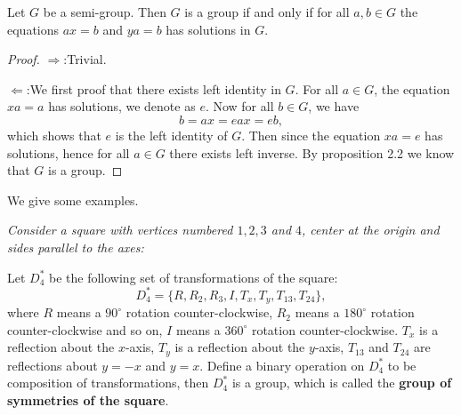 \begin{proposition}
Let $G$ be a semi-group. Then $G$ is a group if and only if for all $a,b\in G$ the equations $ax=b$ and $ya=b$ has solutions in $G$.
\end{proposition}
\begin{proof}
$\Rightarrow$:Trivial.\par
$\Leftarrow$:We first proof that there exists left identity in $G$. For all $a\in G$, the equation $xa=a$ has solutions, we denote as $e$. Now for all $b\in G$, we have 
$$b=ax=eax=eb,$$
which shows that $e$ is the left identity of $G$. Then since the equation $xa=e$ has solutions, hence for all $a\in G$ there exists left inverse. By proposition 2.2 we know that $G$ is a group.
\end{proof}
We give some examples.
\begin{example}\em
Consider a square with vertices numbered $1,2,3$ and $4$, center at the origin and sides parallel to the axes:
\begin{center}

\end{center}
Let $D_4^*$ be the following set of transformations of the square:
$$D_4^*=\{R,R_2,R_3,I,T_x,T_y,T_{13},T_{24}\},$$
where $R$ means a $90^\circ$ rotation counter-clockwise, $R_2$ means a $180^\circ$ rotation counter-clockwise and so on, $I$ means a $360^\circ$ rotation counter-clockwise. $T_x$ is a reflection about the $x$-axis, $T_y$ is a reflection about the $y$-axis, $T_{13}$ and $T_{24}$ are reflections about $y=-x$ and $y=x$. Define a binary operation on $D_4^*$ to be composition of transformations, then $D_4^*$ is a group, which is called the \textbf{group of symmetries of the square}.
\end{example}
